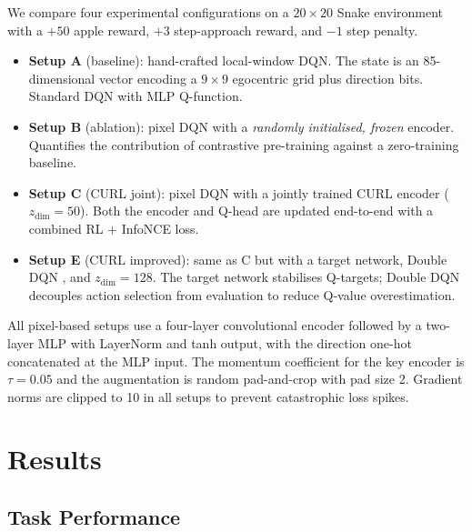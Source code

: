\documentclass[11pt]{article}
\begin{document}
We compare four experimental configurations on a $20\times20$ Snake
environment with a $+50$ apple reward, $+3$ step-approach reward,
and $-1$ step penalty.

\begin{itemize}
    \item \textbf{Setup A} (baseline): hand-crafted local-window DQN.
          The state is an 85-dimensional vector encoding a $9\times9$ egocentric
          grid plus direction bits. Standard DQN with MLP Q-function.
    \item \textbf{Setup B} (ablation): pixel DQN with a \emph{randomly
          initialised, frozen} encoder. Quantifies the contribution of
          contrastive pre-training against a zero-training baseline.
    \item \textbf{Setup C} (CURL joint): pixel DQN with a jointly trained
          CURL encoder ($z_{\dim}=50$). Both the encoder and Q-head are
          updated end-to-end with a combined RL + InfoNCE loss.
    \item \textbf{Setup E} (CURL improved): same as C but with a target
          network, Double DQN \cite{ddqn}, and $z_{\dim}=128$. The target
          network stabilises Q-targets; Double DQN decouples action selection
          from evaluation to reduce Q-value overestimation.
\end{itemize}

All pixel-based setups use a four-layer convolutional encoder followed by a
two-layer MLP with LayerNorm and tanh output, with the direction one-hot
concatenated at the MLP input.
The momentum coefficient for the key encoder is $\tau = 0.05$ and the
augmentation is random pad-and-crop with pad size 2.
Gradient norms are clipped to 10 in all setups to prevent catastrophic
loss spikes.

\section{Results}

\subsection{Task Performance}
\end{document}
